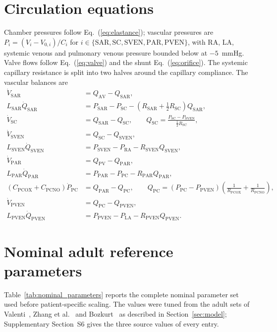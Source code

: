 \documentclass{article}
\begin{document}
\section{Circulation equations}
\label{app:circuit}
Chamber pressures follow Eq.~(\ref{eq:elastance}); vascular pressures are $P_i = (V_i - V_{0,i})/C_i$ for $i \in \{\mathrm{SAR}, \mathrm{SC}, \mathrm{SVEN}, \mathrm{PAR}, \mathrm{PVEN}\}$, with RA, LA, systemic venous and pulmonary venous pressure bounded below at $-5$~mmHg. Valve flows follow Eq.~(\ref{eq:valve}) and the shunt Eq.~(\ref{eq:orifice}). The systemic capillary resistance is split into two halves around the capillary compliance. The vascular balances are
\begin{align}
\dot{V}_{\mathrm{SAR}} &= Q_{\mathrm{AV}} - Q_{\mathrm{SAR}}, \\
L_{\mathrm{SAR}}\dot{Q}_{\mathrm{SAR}} &= P_{\mathrm{SAR}} - P_{\mathrm{SC}} - \left(R_{\mathrm{SAR}} + \tfrac{1}{2}R_{\mathrm{SC}}\right)Q_{\mathrm{SAR}}, \\
\dot{V}_{\mathrm{SC}} &= Q_{\mathrm{SAR}} - Q_{\mathrm{SC}}, \qquad Q_{\mathrm{SC}} = \frac{P_{\mathrm{SC}} - P_{\mathrm{SVEN}}}{\tfrac{1}{2}R_{\mathrm{SC}}}, \\
\dot{V}_{\mathrm{SVEN}} &= Q_{\mathrm{SC}} - Q_{\mathrm{SVEN}}, \\
L_{\mathrm{SVEN}}\dot{Q}_{\mathrm{SVEN}} &= P_{\mathrm{SVEN}} - P_{\mathrm{RA}} - R_{\mathrm{SVEN}}Q_{\mathrm{SVEN}}, \\
\dot{V}_{\mathrm{PAR}} &= Q_{\mathrm{PV}} - Q_{\mathrm{PAR}}, \\
L_{\mathrm{PAR}}\dot{Q}_{\mathrm{PAR}} &= P_{\mathrm{PAR}} - P_{\mathrm{PC}} - R_{\mathrm{PAR}}Q_{\mathrm{PAR}}, \\
\left(C_{\mathrm{PCOX}} + C_{\mathrm{PCNO}}\right)\dot{P}_{\mathrm{PC}} &= Q_{\mathrm{PAR}} - Q_{\mathrm{PC}}, \qquad Q_{\mathrm{PC}} = \left(P_{\mathrm{PC}} - P_{\mathrm{PVEN}}\right)\left(\frac{1}{R_{\mathrm{PCOX}}} + \frac{1}{R_{\mathrm{PCNO}}}\right), \\
\dot{V}_{\mathrm{PVEN}} &= Q_{\mathrm{PC}} - Q_{\mathrm{PVEN}}, \\
L_{\mathrm{PVEN}}\dot{Q}_{\mathrm{PVEN}} &= P_{\mathrm{PVEN}} - P_{\mathrm{LA}} - R_{\mathrm{PVEN}}Q_{\mathrm{PVEN}}.
\end{align}

\section{Nominal adult reference parameters}
\label{app:nominal_parameters}
Table~\ref{tab:nominal_parameters} reports the complete nominal parameter set used before patient-specific scaling. The values were tuned from the adult sets of Valenti~\cite{Valenti2023}, Zhang et al.~\cite{zhang2019multiscale} and Bozkurt~\cite{Bozkurt2019} as described in Section~\ref{sec:model}; Supplementary Section~S6 gives the three source values of every entry.
\end{document}
